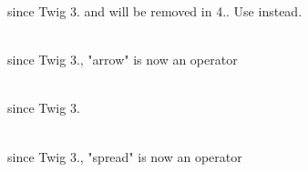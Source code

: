 \begin{DoxyRefList}
\label{deprecated__deprecated000037}%
%
since Twig 3. and will be removed in 4.. Use  instead.  
\item[{\parbox[t]{\linewidth}{Global(e) \doxylink{class_twig_1_1_token_afd415022da3c257fb2568f40266a7b22}{Token::\+ARROW\+\_\+\+TYPE} }}]\hfill \\
\label{deprecated__deprecated000041}%
%
since Twig 3., "{}arrow"{} is now an operator  
\item[{\parbox[t]{\linewidth}{Global(e) \doxylink{class_twig_1_1_token_a830b5c75df72b32396701bc563fbe3c7}{Token::\+get\+Type} ()}}]\hfill \\
\label{deprecated__deprecated000043}%
%
since Twig 3.  
\item[{\parbox[t]{\linewidth}{Global(e) \doxylink{class_twig_1_1_token_aecaffe9e1ae415903862540e585fc9ff}{Token::\+SPREAD\+\_\+\+TYPE} }}]\hfill \\
\label{deprecated__deprecated000042}%
%
since Twig 3., "{}spread"{} is now an operator 
\end{DoxyRefList}